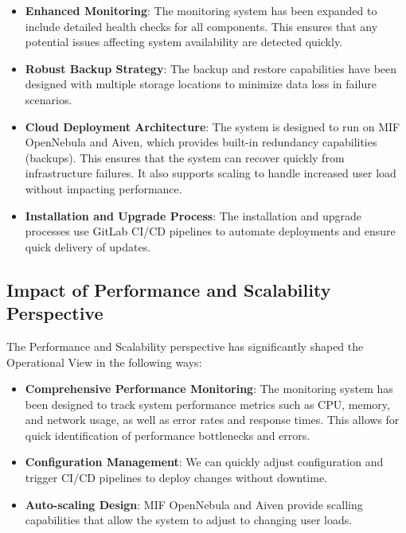 \begin{itemize}
    \item \textbf{Enhanced Monitoring}: The monitoring system has been expanded
    to include detailed health checks for all components. This ensures that any
    potential issues affecting system availability are detected quickly.

    \item \textbf{Robust Backup Strategy}: The backup and restore capabilities
    have been designed with multiple storage locations to minimize data loss in
    failure scenarios. 

    \item \textbf{Cloud Deployment Architecture}: The system is designed to run
    on MIF OpenNebula and Aiven, which provides built-in redundancy capabilities
    (backups). This ensures that the system can recover quickly from
    infrastructure failures. It also supports scaling to handle increased user
    load without impacting performance.

    \item \textbf{Installation and Upgrade Process}: The installation and
    upgrade processes use GitLab CI/CD pipelines to automate deployments and 
    ensure quick delivery of updates.
\end{itemize}

\subsection{Impact of Performance and Scalability Perspective}

The Performance and Scalability perspective has significantly shaped the Operational View in the following ways:

\begin{itemize}
    \item \textbf{Comprehensive Performance Monitoring}: The monitoring system
    has been designed to track system performance metrics such as CPU, memory,
    and network usage, as well as error rates and response times. This allows
    for quick identification of performance bottlenecks and errors.

    \item \textbf{Configuration Management}: We can quickly adjust configuration and trigger
    CI/CD pipelines to deploy changes without downtime.

    \item \textbf{Auto-scaling Design}: MIF OpenNebula and Aiven provide
    scalling capabilities that allow the system to adjust to changing user loads.

\end{itemize}

